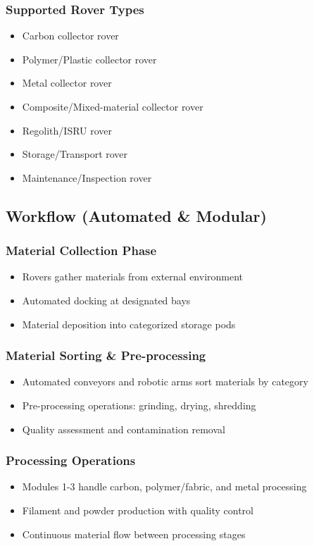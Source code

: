 \documentclass[12pt, a4paper]{article}
\begin{document}
\subsubsection{Supported Rover Types}
\begin{itemize}
    \item Carbon collector rover
    \item Polymer/Plastic collector rover
    \item Metal collector rover
    \item Composite/Mixed-material collector rover
    \item Regolith/ISRU rover
    \item Storage/Transport rover
    \item Maintenance/Inspection rover
\end{itemize}

\subsection{Workflow (Automated \& Modular)}

\subsubsection{Material Collection Phase}
\begin{itemize}
    \item Rovers gather materials from external environment
    \item Automated docking at designated bays
    \item Material deposition into categorized storage pods
\end{itemize}

\subsubsection{Material Sorting \& Pre-processing}
\begin{itemize}
    \item Automated conveyors and robotic arms sort materials by category
    \item Pre-processing operations: grinding, drying, shredding
    \item Quality assessment and contamination removal
\end{itemize}

\subsubsection{Processing Operations}
\begin{itemize}
    \item Modules 1-3 handle carbon, polymer/fabric, and metal processing
    \item Filament and powder production with quality control
    \item Continuous material flow between processing stages
\end{itemize}
\end{document}
